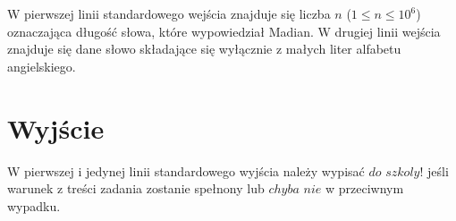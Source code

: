 \documentclass[zad,zawodnik,utf8]{sinol}
\begin{document}
\begin{tasktext}
W pierwszej linii standardowego wejścia znajduje się liczba $n$ ($1 \leq n \leq 10^{6}$) oznaczająca długość słowa, które wypowiedział Madian. W drugiej linii wejścia znajduje się dane słowo składające się wyłącznie z małych liter alfabetu angielskiego.

	\section{Wyjście}
	W pierwszej i jedynej linii standardowego wyjścia należy wypisać $do$ $szkoly!$ jeśli warunek z treści zadania zostanie spełnony lub $chyba$ $nie$ w przeciwnym wypadku.	
	\makecompactexample

	\iffalse
	\section{Wyjaśnienie do przykładu}
	A rafał, to lubi jeść kupę.
	\section{Punkty cząstkowe}
	W testach wartych $44\%$ punktów $n \leq 20$.\\
	W testach wartych $74\%$ punktów $n \leq 500$.
	\fi
\end{tasktext}
\end{document}

